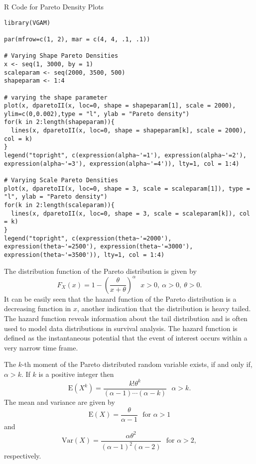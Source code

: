 \documentclass[]{book}
\theoremstyle{definition}
\theoremstyle{definition}
\theoremstyle{definition}
\theoremstyle{remark}
\begin{document}
R Code for Pareto Density Plots

\hypertarget{display.Paretoscale.2}{}
\begin{verbatim}
library(VGAM)

par(mfrow=c(1, 2), mar = c(4, 4, .1, .1))

# Varying Shape Pareto Densities
x <- seq(1, 3000, by = 1)
scaleparam <- seq(2000, 3500, 500)
shapeparam <- 1:4

# varying the shape parameter
plot(x, dparetoII(x, loc=0, shape = shapeparam[1], scale = 2000), ylim=c(0,0.002),type = "l", ylab = "Pareto density")
for(k in 2:length(shapeparam)){
  lines(x, dparetoII(x, loc=0, shape = shapeparam[k], scale = 2000), col = k)
}
legend("topright", c(expression(alpha~'=1'), expression(alpha~'=2'), expression(alpha~'=3'), expression(alpha~'=4')), lty=1, col = 1:4)

# Varying Scale Pareto Densities
plot(x, dparetoII(x, loc=0, shape = 3, scale = scaleparam[1]), type = "l", ylab = "Pareto density")
for(k in 2:length(scaleparam)){
  lines(x, dparetoII(x, loc=0, shape = 3, scale = scaleparam[k]), col = k)
}
legend("topright", c(expression(theta~'=2000'), expression(theta~'=2500'), expression(theta~'=3000'), expression(theta~'=3500')), lty=1, col = 1:4)
\end{verbatim}

The distribution function of the Pareto distribution is given by
\[F_{X}\left( x \right) = 1 - \left( \frac{\theta}{x + \theta} \right)^{\alpha}  \ \ \ x > 0,\ \alpha > 0,\ \theta > 0.\]
It can be easily seen that the hazard function of the Pareto
distribution is a decreasing function in \(x\), another indication that
the distribution is heavy tailed. The hazard function reveals
information about the tail distribution and is often used to model data
distributions in survival analysis. The hazard function is defined as
the instantaneous potential that the event of interest occurs within a
very narrow time frame.

The \(k\)-th moment of the Pareto distributed random variable exists, if
and only if, \(\alpha > k\). If \(k\) is a positive integer then
\[\mathrm{E}\left( X^{k} \right) = \frac{k!\theta^{k}}{\left( \alpha - 1 \right)\cdots\left( \alpha - k \right)} \ \ \ \alpha > k.\]
The mean and variance are given by
\[\mathrm{E}\left( X \right) = \frac{\theta}{\alpha - 1} \ \ \ \text{for } \alpha > 1\]
and
\[\mathrm{Var}\left( X \right) = \frac{\alpha\theta^{2}}{\left( \alpha - 1 \right)^{2}\left( \alpha - 2 \right)} \ \ \ \text{for } \alpha > 2,\]respectively.
\end{document}
